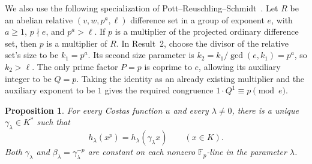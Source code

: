 \documentclass[11pt]{article}
\newtheorem{proposition}[theorem]{Proposition}
\theoremstyle{definition}
\theoremstyle{remark}
\newcommand{\Fp}{\mathbb F_p}
\numberwithin{equation}{section}
\begin{document}
We also use the following specialization of
Pott--Reuschling--Schmidt~\cite[Result~2]{PRS}.
Let \(R\) be an abelian relative \((v,w,p^a,\ell)\) difference set
in a group of exponent \(e\), with \(a\ge1\), \(p\nmid e\), and \(p^a>\ell\).
If \(p\) is a multiplier of the projected ordinary difference set,
then \(p\) is a multiplier of \(R\).
In Result~2, choose the divisor of the relative set's size to be
\(k_1=p^a\). Its second size parameter is
\(k_2=k_1/\gcd(e,k_1)=p^a\), so \(k_2>\ell\).
The only prime factor \(P=p\) is coprime to \(e\), allowing its
auxiliary integer to be \(Q=p\).
Taking the identity as an already existing multiplier and the
auxiliary exponent to be \(1\) gives the required congruence
\(1\cdot Q^1\equiv p\pmod e\).

\begin{proposition}\label{prop:scalar-multiplier}
For every Costas function \(u\) and every \(\lambda\ne0\), there is a
unique \(\gamma_\lambda\in K^*\) such that
\begin{equation}\label{eq:scalar-multiplier}
 h_\lambda(x^p)=h_\lambda(\gamma_\lambda x)\qquad(x\in K).
\end{equation}
Both \(\gamma_\lambda\) and
\(\beta_\lambda=\gamma_\lambda^{-p}\) are constant on each
nonzero \(\Fp\)-line in the parameter \(\lambda\).
\end{proposition}
\end{document}
